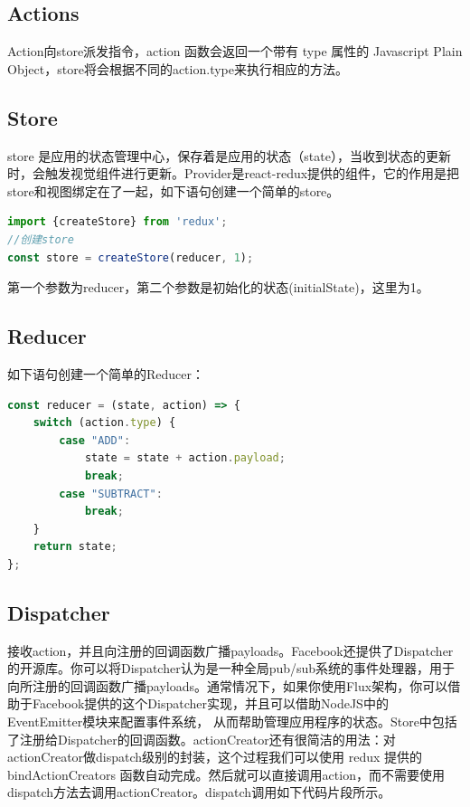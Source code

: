 \documentclass[letter]{book}
\begin{document}
\subsection{Actions}

Action向store派发指令，action 函数会返回一个带有 type 属性的 Javascript Plain Object，store将会根据不同的action.type来执行相应的方法。

\subsection{Store}

store 是应用的状态管理中心，保存着是应用的状态（state），当收到状态的更新时，会触发视觉组件进行更新。Provider是react-redux提供的组件，它的作用是把store和视图绑定在了一起，如下语句创建一个简单的store。

\begin{lstlisting}[language=Javascript]
import {createStore} from 'redux';
//创建store
const store = createStore(reducer, 1);
\end{lstlisting}

第一个参数为reducer，第二个参数是初始化的状态(initialState)，这里为1。

\subsection{Reducer}

如下语句创建一个简单的Reducer：

\begin{lstlisting}[language=Javascript]
const reducer = (state, action) => {
	switch (action.type) {
		case "ADD":
			state = state + action.payload;
			break;
		case "SUBTRACT":
			break;
	}
	return state;
};
\end{lstlisting}

\subsection{Dispatcher}

接收action，并且向注册的回调函数广播payloads。Facebook还提供了Dispatcher的开源库。你可以将Dispatcher认为是一种全局pub/sub系统的事件处理器，用于向所注册的回调函数广播payloads。通常情况下，如果你使用Flux架构，你可以借助于Facebook提供的这个Dispatcher实现，并且可以借助NodeJS中的EventEmitter模块来配置事件系统， 从而帮助管理应用程序的状态。Store中包括了注册给Dispatcher的回调函数。actionCreator还有很简洁的用法：对actionCreator做dispatch级别的封装，这个过程我们可以使用 redux 提供的 bindActionCreators 函数自动完成。然后就可以直接调用action，而不需要使用dispatch方法去调用actionCreator。dispatch调用如下代码片段所示。
\end{document}
